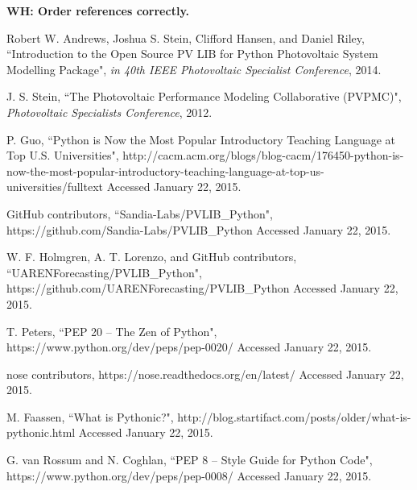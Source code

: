 \documentclass[conference]{IEEEtran}
\newcommand{\holmgren}[1]{{\bf\color{red} WH: #1}}
\begin{document}
%
%
%
\begin{thebibliography}{1}

\holmgren{Order references correctly.}

Robert W. Andrews, Joshua S. Stein, Clifford Hansen, and Daniel Riley, ``Introduction to the Open Source PV LIB for Python Photovoltaic System Modelling Package", \emph {in 40th IEEE Photovoltaic Specialist Conference}, 2014. 

J. S. Stein, ``The Photovoltaic Performance Modeling Collaborative (PVPMC)", \emph{Photovoltaic Specialists Conference}, 2012.

P. Guo, ``Python is Now the Most Popular Introductory Teaching Language at Top U.S. Universities", http://cacm.acm.org/blogs/blog-cacm/176450-python-is-now-the-most-popular-introductory-teaching-language-at-top-us-universities/fulltext Accessed January 22, 2015.

GitHub contributors, ``Sandia-Labs/PVLIB{\_}Python", https://github.com/Sandia-Labs/PVLIB{\_}Python Accessed January 22, 2015.

W. F. Holmgren, A. T. Lorenzo, and GitHub contributors, ``UARENForecasting/PVLIB{\_}Python", https://github.com/UARENForecasting/PVLIB{\_}Python Accessed January 22, 2015.

T. Peters, ``PEP 20 -- The Zen of Python", https://www.python.org/dev/peps/pep-0020/ Accessed January 22, 2015.

nose contributors, https://nose.readthedocs.org/en/latest/ Accessed January 22, 2015.

M. Faassen, ``What is Pythonic?", http://blog.startifact.com/posts/older/what-is-pythonic.html Accessed January 22, 2015.

G. van Rossum and N. Coghlan, ``PEP 8 -- Style Guide for Python Code", https://www.python.org/dev/peps/pep-0008/ Accessed January 22, 2015.


\end{thebibliography}
\end{document}

